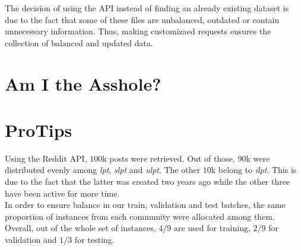 \documentclass[11pt,a4paper]{article}
\begin{document}
The decision of using the API instead of finding an already existing dataset is 
due to the fact that some of these files are unbalanced, outdated or contain unnecessary information. Thus, making customizaed requests ensures the collection of balanced and updated data. 

\section{Am I the Asshole?}
\label{sec:aita}

\section{ProTips}
\label{sec:protips}
Using the Reddit API, $100$k posts were retrieved. Out of those, $90$k were distributed
evenly among \textit{lpt}, \textit{slpt} and \textit{ulpt}. The other $10$k belong to
\textit{ilpt}. This is due to the fact that the latter was created two years ago
while the other three have been active for more time.\\
In order to ensure balance in our train, validation and test batches, the same proportion
of instances from each community were allocated among them.\\
Overall, out of the whole set of instances, $4/9$ are used for training, $2/9$ for
validation and $1/3$ for testing.\\
\end{document}
